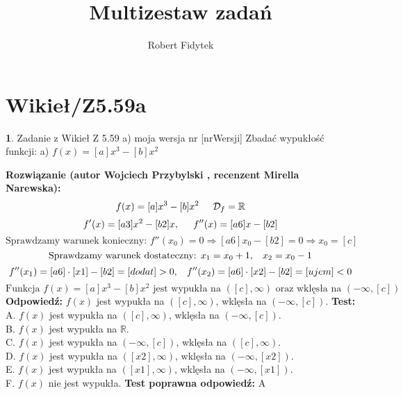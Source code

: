 \documentclass[12pt, a4paper]{article}
\title{Multizestaw zadań}
\author{Robert Fidytek}
\date{}
\theoremstyle{definition} %
\newtheorem{zad}{}
\newcommand{\kategoria}[1]{\section{#1}} %
\newcommand{\zadStart}[1]{\begin{zad}#1\newline} %
\newcommand{\zadStop}{\end{zad}}   %
\newcommand{\rozwStart}[2]{\noindent \textbf{Rozwiązanie (autor #1 , recenzent #2): }\newline} %
\newcommand{\rozwStop}{\newline}                                            %
\newcommand{\odpStart}{\noindent \textbf{Odpowiedź:}\newline}    %
\newcommand{\odpStop}{\newline}                                             %
\newcommand{\testStart}{\noindent \textbf{Test:}\newline} %
\newcommand{\testStop}{\newline} %
\newcommand{\kluczStart}{\noindent \textbf{Test poprawna odpowiedź:}\newline} %
\newcommand{\kluczStop}{\newline} %
\begin{document}
\maketitle


\kategoria{Wikieł/Z5.59a}
\zadStart{Zadanie z Wikieł Z 5.59 a) moja wersja nr [nrWersji]}
Zbadać wypukłość funkcji:
a) $ f(x)=[a]x^{3}-[b]x^{2}$
\zadStop
\rozwStart{Wojciech Przybylski}{Mirella Narewska}
$$ f(x)=[a]x^{3}-[b]x^{2}\hspace{5mm} \mathcal{D}_{f}=\mathbb{R}$$
$$ f'(x)=[a3]x^{2}-[b2]x, \hspace {5mm} f''(x)=[a6]x-[b2]$$
$$\mbox{Sprawdzamy warunek konieczny: }f''(x_{0})=0 \Rightarrow [a6]x_{0}-[b2]=0\Rightarrow x_{0}=[c]$$
$$\mbox{Sprawdzamy warunek dostateczny: }x_{1}=x_{0}+1, \hspace{3mm} x_{2}=x_{0}-1$$
$$f''(x_{1})=[a6]\cdot[x1]-[b2]=[dodat]>0,\hspace{3mm}f''(x_{2})=[a6]\cdot[x2]-[b2]=[ujem]<0$$
$$\mbox{Funkcja } f(x)=[a]x^{3}-[b]x^{2} \mbox{ jest wypukła na } ([c],\infty) \mbox{ oraz wklęsła na }(-\infty,[c])$$
\rozwStop
\odpStart
$f(x)$ jest wypukła na $([c],\infty)$, wklęsła na $(-\infty,[c])$.
\odpStop
\testStart
A. $f(x)$ jest wypukła na $([c],\infty)$, wklęsła na $(-\infty,[c])$.\\
B. $f(x)$ jest wypukła na $\mathbb{R}$.\\
C. $f(x)$ jest wypukła na $(-\infty,[c])$, wklęsła na $([c],\infty)$.\\
D. $f(x)$ jest wypukła na $([x2],\infty)$, wklęsła na $(-\infty,[x2])$.\\
E. $f(x)$ jest wypukła na $([x1],\infty)$, wklęsła na $(-\infty,[x1])$.\\
F. $f(x)$ nie jest wypukła.
\testStop
\kluczStart
A
\kluczStop
\end{document}
